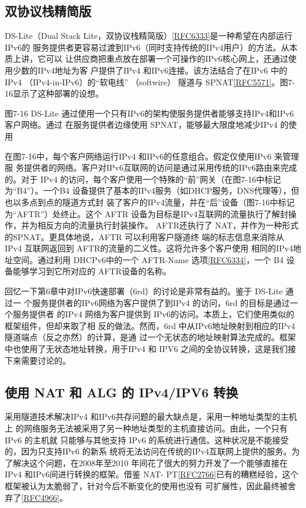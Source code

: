 \subsection{双协议栈精简版}

DS-Lite（Dual Stack
Lite，双协议栈精简版）\href{https://www.rfc-editor.org/rfc/rfc6333}{[RFC6333]}是一种希望在内部运行IPv6的
服务提供者更容易过渡到IPv6（同时支持传统的IPv4用户）的方法。从本质上讲，它可以
让供应商把重点放在部署一个可操作的IPv6核心网上，还通过使用少数的IPv4地址为客
户提供了IPv4 和IPv6连接。该方法结合了在IPv6 中的IPv4 （IPv4-in-IPv6）的“软电线”
（softwire） 隧道与
SPNAT\href{https://www.rfc-editor.org/rfc/rfc5571}{[RFC5571]}。图7-16显示了这种部署的设想。

图7-16
DS-Lite 通过使用一个只有IPv6的架构使服务提供者能够支持IPv4和IPv6 客户网络。通过
在服务提供者边缘使用 SPNAT，能够最大限度地减少IPv4 的使用

在图7-16中，每个客户网络运行IPv4 和IPv6的任意组合。假定仅使用IPv6 来管理服
务提供者的网络。客户对IPv6互联网的访问是通过采用传统的IPv6路由来完成的。对于
IPv4 的访问，每个客户使用一个特殊的“前”网关（在图7-16中标记为“B4”）。一个B4
设备提供了基本的IPv4服务（如DHCP服务，DNS代理等），但也以多点到点的隧道方式封
装了客户的IPv4流量，并在“后”设备（图7-16中标记为“AFTR”）处终止。这个 AFTR
设备为目标是IPv4互联网的流量执行了解封操作，并为相反方向的流量执行封装操作。
AFTR还执行了 NAT，并作为一种形式的SPNAT。更具体地说，AFTR 可以利用客户隧道终
端的标志信息来消除从 IPv4 互联网返回到 AFTR的流量的二义性。这将允许多个客户使用
相同的IPv4地址空间。通过利用 DHCPv6中的一个 AFTR-Name
选项\href{https://www.rfc-editor.org/rfc/rfc6334}{[RFC6334]}，一个 B4
设备能够学习到它所对应的 AFTR设备的名称。

回忆一下第6章中对IPv6快速部署（6rd）的讨论是非常有益的。鉴于 DS-Lite 通过一
个服务提供者的IPv6网络为客户提供了到IPv4 的访问，6rd 的目标是通过一个服务提供者
的IPv4 网络为客户提供到 IPv6的访问。本质上，它们使用类似的框架组件，但却来取了相
反的做法。然而，6rd 中从IPv6地址映射到相应的IPv4 隧道端点（反之亦然）的计算，是通
过一个无状态的地址映射算法完成的。框架中也使用了无状态地址转换，用于IPv4 和 IPV6
之间的全协议转换，这是我们接下来需要讨论的。

\subsection{使用 NAT 和 ALG 的 IPv4/IPV6 转换}

采用隧道技术解决IPv4 和IPv6共存问题的最大缺点是，采用一种地址类型的主机上
的网络服务无法被采用了另一种地址类型的主机直接访问。由此，一个只有IPv6 的主机就
只能够与其他支持 IPv6 的系统进行通信。这种状况是不能接受的，因为只支持IPv6 的新系
统将无法访问在传统的IPv4互联网上提供的服务。为了解决这个问题，在2008年至2010
年间花了很大的努力开发了一个能够直接在IPv4 和IPv6间进行转换的框架。借鉴 NAT-
PT\href{https://www.rfc-editor.org/rfc/rfc2766}{[RFC2766]}已有的糟糕经验，这个框架被认为太脆弱了，针对今后不断变化的使用也没有
可扩展性，因此最终被舍弃了\href{https://www.rfc-editor.org/rfc/rfc4966}{[RFC4966]}。

